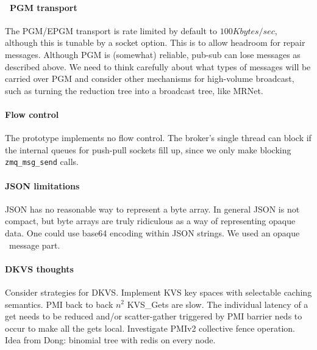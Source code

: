 \paragraph{\zMQ\ PGM transport}  The PGM/EPGM transport is rate limited by
default to $100 Kbytes/sec$, although this is tunable by a socket option.
This is to allow headroom for repair messages.
Although PGM is (somewhat) reliable, pub-sub can lose messages as described
above.
We need to think carefully about what types of messages will be carried
over PGM and consider other mechanisms for high-volume broadcast,
such as turning the reduction tree into a broadcast tree, like MRNet.

\paragraph{Flow control}  The prototype implements no flow control.
The broker's single thread can block if the internal queues for push-pull
sockets fill up, since we only make blocking {\tt zmq\_msg\_send} calls.

\paragraph{JSON limitations}  JSON has no reasonable way to represent
a byte array.  In general JSON is not compact, but byte arrays are truly
ridiculous as a way of representing opaque data.  One could use base64
encoding within JSON strings.  We used an opaque \zMQ\ message part.

\paragraph{DKVS thoughts}  Consider strategies for DKVS.  Implement KVS
key spaces with selectable caching semantics.
PMI back to back $n^2$ KVS\_Gets are slow.  The individual latency of a get
needs to be reduced and/or scatter-gather triggered by PMI barrier neds to
occur to make all the gets local.  Investigate PMIv2 collective fence
operation.
Idea from Dong: binomial tree with redis on every node.
